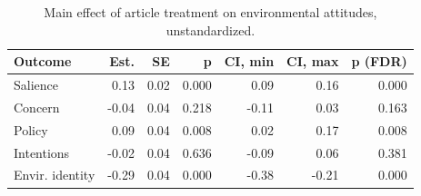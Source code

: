 \begin{table}[h!t]
\centering
\begin{tabular}{lrrrrrr}
  \hline
Outcome & Est. & SE & p & CI, min & CI, max & p (FDR) \\ 
  \hline
Salience & 0.13 & 0.02 & 0.000 & 0.09 & 0.16 & 0.000 \\ 
  Concern & -0.04 & 0.04 & 0.218 & -0.11 & 0.03 & 0.163 \\ 
  Policy & 0.09 & 0.04 & 0.008 & 0.02 & 0.17 & 0.008 \\ 
  Intentions & -0.02 & 0.04 & 0.636 & -0.09 & 0.06 & 0.381 \\ 
  Envir. identity & -0.29 & 0.04 & 0.000 & -0.38 & -0.21 & 0.000 \\ 
   \hline
\end{tabular}
\caption{Main effect of article treatment on environmental attitudes, unstandardized.} 
\label{tab:main_unstand}
\end{table}
